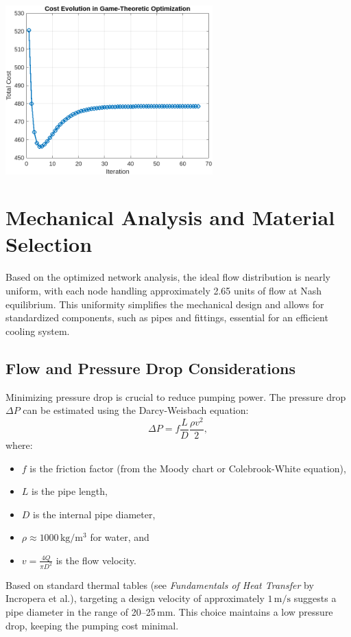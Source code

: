 \documentclass{article}
\begin{document}
\begin{center}
\includegraphics[width=0.6\textwidth]{images/game theoric.png}
\end{center}



\section{Mechanical Analysis and Material Selection}
Based on the optimized network analysis, the ideal flow distribution is nearly uniform, with each node handling approximately 2.65 units of flow at Nash equilibrium. This uniformity simplifies the mechanical design and allows for standardized components, such as pipes and fittings, essential for an efficient cooling system.

\subsection{Flow and Pressure Drop Considerations}
Minimizing pressure drop is crucial to reduce pumping power. The pressure drop \(\Delta P\) can be estimated using the Darcy-Weisbach equation:
\[
\Delta P = f \frac{L}{D} \frac{\rho v^2}{2},
\]
where:
\begin{itemize}
    \item \(f\) is the friction factor (from the Moody chart or Colebrook-White equation),
    \item \(L\) is the pipe length,
    \item \(D\) is the internal pipe diameter,
    \item \(\rho \approx 1000\,\mathrm{kg/m^3}\) for water, and
    \item \(v = \frac{4Q}{\pi D^2}\) is the flow velocity.
\end{itemize}
Based on standard thermal tables (see \textit{Fundamentals of Heat Transfer} by Incropera et al.), targeting a design velocity of approximately \(1\,\mathrm{m/s}\) suggests a pipe diameter in the range of 20–25\,mm. This choice maintains a low pressure drop, keeping the pumping cost minimal.
\end{document}
